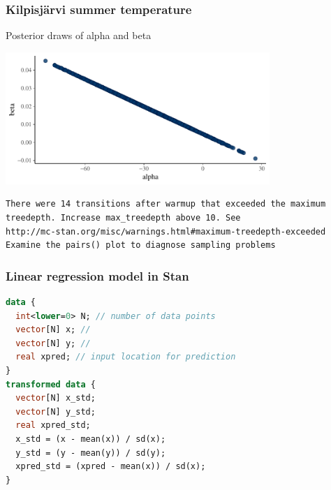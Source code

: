 \documentclass[10pt]{beamer}
\begin{document}
\begin{frame}[fragile]

\frametitle{Kilpisjärvi summer temperature}

  Posterior draws of alpha and beta

  \begin{center}
    \includegraphics[width=10cm]{figs/kilpis_lin_mcmc_scatter.pdf}
  \end{center}

{\scriptsize
\begin{lstlisting}
There were 14 transitions after warmup that exceeded the maximum
treedepth. Increase max_treedepth above 10. See
http://mc-stan.org/misc/warnings.html#maximum-treedepth-exceeded
Examine the pairs() plot to diagnose sampling problems
\end{lstlisting}
}

\end{frame}

\begin{frame}[fragile]

\frametitle{Linear regression model in Stan}

  {\scriptsize
\begin{lstlisting}[language=Stan]
data {
  int<lower=0> N; // number of data points
  vector[N] x; //
  vector[N] y; //
  real xpred; // input location for prediction
}
transformed data {
  vector[N] x_std;
  vector[N] y_std;
  real xpred_std;
  x_std = (x - mean(x)) / sd(x);
  y_std = (y - mean(y)) / sd(y);
  xpred_std = (xpred - mean(x)) / sd(x);
}
\end{lstlisting}
  }
\end{frame}

\end{document}
